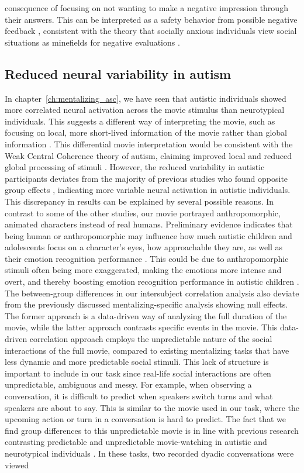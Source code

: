 consequence of focusing on not wanting to make a negative impression through their answers. This can be interpreted as a safety behavior from possible negative feedback \citep{wells1995}, consistent with the theory that socially anxious individuals view social situations as minefields for negative evaluations \citep{rapee1997}. 

\subsection{Reduced neural variability in autism}

In chapter~\ref{ch:mentalizing_asc}, we have seen that autistic individuals showed more correlated neural activation across the movie stimulus than neurotypical individuals. This suggests a different way of interpreting the movie, such as focusing on local, more short-lived information of the movie rather than global information \citep{barnes2012,geelhand2020}. This differential movie interpretation would be consistent with the Weak Central Coherence theory of autism, claiming improved local and reduced global processing of stimuli \citep{happe1997}. However, the reduced variability in autistic participants deviates from the majority of previous studies who found opposite group effects \citep{byrge2015,hasson2009,lyons2020,salmi2013}, indicating more variable neural activation in autistic individuals. This discrepancy in results can be explained by several possible reasons. In contrast to some of the other studies, our movie portrayed anthropomorphic, animated characters instead of real humans. Preliminary evidence indicates that being human or anthropomorphic may influence how much autistic children and adolescents focus on a character's eyes, how approachable they are, as well as their emotion recognition performance \citep{atherton2018}. This could be due to anthropomorphic stimuli often being more exaggerated, making the emotions more intense and overt, and thereby boosting emotion recognition performance in autistic children \citep{carter2016,rump2009}. The between-group differences in our intersubject correlation analysis also deviate from the previously discussed mentalizing-specific analysis showing null effects. The former approach is a data-driven way of analyzing the full duration of the movie, while the latter approach contrasts specific events in the movie. This data-driven correlation approach employs the unpredictable nature of the social interactions of the full movie, compared to existing mentalizing tasks that have less dynamic and more predictable social stimuli. This lack of structure is important to include in our task since real-life social interactions are often unpredictable, ambiguous and messy. For example, when observing a conversation, it is difficult to predict when speakers switch turns and what speakers are about to say. This is similar to the movie used in our task, where the upcoming action or turn in a conversation is hard to predict. The fact that we find group differences to this unpredictable movie is in line with previous research contrasting predictable and unpredictable movie-watching in autistic and neurotypical individuals \citep{roeyers2001,ponnet2008}. In these tasks, two recorded dyadic conversations were viewed 